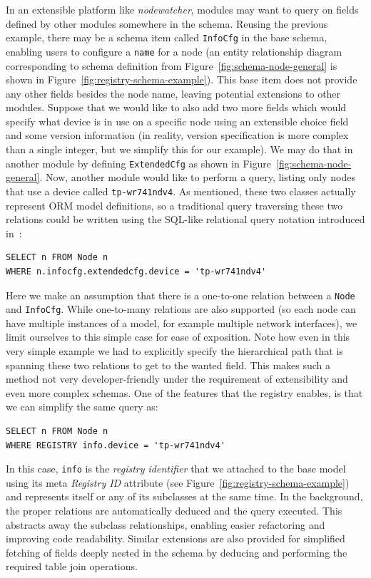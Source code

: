 \documentclass[5p,sort&compress]{elsarticle}
\newcommand{\nodewatcher}{\textit{nodewatcher}}
\begin{document}
In an extensible platform like \nodewatcher{}, modules may want to query on fields defined by other modules somewhere in the schema.
Reusing the previous example, there may be a schema item called \texttt{InfoCfg} in the base schema, enabling users to configure a \texttt{name} for a node (an entity relationship diagram corresponding to schema definition from Figure~\ref{fig:schema-node-general} is shown in Figure~\ref{fig:registry-schema-example}).
This base item does not provide any other fields besides the node name, leaving potential extensions to other modules.
Suppose that we would like to also add two more fields which would specify what device is in use on a specific node using an extensible choice field and some version information (in reality, version specification is more complex than a single integer, but we simplify this for our example).
We may do that in another module by defining \texttt{ExtendedCfg} as shown in Figure~\ref{fig:schema-node-general}.
Now, another module would like to perform a query, listing only nodes that use a device called \texttt{tp-wr741ndv4}.
As mentioned, these two classes actually represent ORM model definitions, so a traditional query traversing these two relations could be written using the SQL-like relational query notation introduced in~\cite{ONeil_2008}:
\begin{verbatim}
SELECT n FROM Node n
WHERE n.infocfg.extendedcfg.device = 'tp-wr741ndv4'
\end{verbatim}

Here we make an assumption that there is a one-to-one relation between a \texttt{Node} and \texttt{InfoCfg}.
While one-to-many relations are also supported (so each node can have multiple instances of a model, for example multiple network interfaces), we limit ourselves to this simple case for ease of exposition.
Note how even in this very simple example we had to explicitly specify the hierarchical path that is spanning these two relations to get to the wanted field.
This makes such a method not very developer-friendly under the requirement of extensibility and even more complex schemas.
One of the features that the registry enables, is that we can simplify the same query as:
\begin{verbatim}
SELECT n FROM Node n
WHERE REGISTRY info.device = 'tp-wr741ndv4'
\end{verbatim}

In this case, \texttt{info} is the \textit{registry identifier} that we attached to the base model using its meta \textit{Registry ID} attribute (see Figure~\ref{fig:registry-schema-example}) and represents itself or any of its subclasses at the same time.
In the background, the proper relations are automatically deduced and the query executed.
This abstracts away the subclass relationships, enabling easier refactoring and improving code readability.
Similar extensions are also provided for simplified fetching of fields deeply nested in the schema by deducing and performing the required table join operations.
\end{document}
